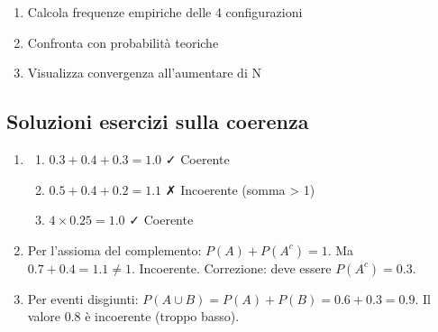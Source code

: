 \documentclass[
  italian,
  letterpaper,
  a4paper,
  11pt,
  open=any]{scrbook}
\providecommand{\tightlist}{%
  \setlength{\itemsep}{0pt}\setlength{\parskip}{0pt}}
\theoremstyle{plain}
\theoremstyle{definition}
\theoremstyle{definition}
\theoremstyle{remark}
\begin{document}
\begin{tcolorbox}
\begin{enumerate}
  \begin{enumerate}
  \def\labelenumii{\alph{enumii}.}
  \tightlist
  \item
    Calcola frequenze empiriche delle 4 configurazioni
  \item
    Confronta con probabilità teoriche
  \item
    Visualizza convergenza all'aumentare di N
  \end{enumerate}
\end{enumerate}

\end{tcolorbox}

\begin{tcolorbox}[enhanced jigsaw, arc=.35mm, bottomrule=.15mm, bottomtitle=1mm, breakable, colback=white, colbacktitle=quarto-callout-tip-color!10!white, colframe=quarto-callout-tip-color-frame, coltitle=black, left=2mm, leftrule=.75mm, opacityback=0, opacitybacktitle=0.6, rightrule=.15mm, title=\textcolor{quarto-callout-tip-color}{\faLightbulb}\hspace{0.5em}{Soluzioni}, titlerule=0mm, toprule=.15mm, toptitle=1mm]

\subsection{Soluzioni esercizi sulla
coerenza}\label{soluzioni-esercizi-sulla-coerenza}

\begin{enumerate}
\def\labelenumi{\arabic{enumi}.}
\item
  \begin{enumerate}
  \def\labelenumii{\alph{enumii}.}
  \tightlist
  \item
    \(0.3 + 0.4 + 0.3 = 1.0\) ✓ Coerente\\
  \item
    \(0.5 + 0.4 + 0.2 = 1.1\) ✗ Incoerente (somma \textgreater{} 1)\\
  \item
    \(4 \times 0.25 = 1.0\) ✓ Coerente
  \end{enumerate}
\item
  Per l'assioma del complemento: \(P(A) + P(A^c) = 1\). Ma
  \(0.7 + 0.4 = 1.1 \neq 1\). Incoerente. Correzione: deve essere
  \(P(A^c) = 0.3\).
\item
  Per eventi disgiunti: \(P(A \cup B) = P(A) + P(B) = 0.6 + 0.3 = 0.9\).
  Il valore 0.8 è incoerente (troppo basso).
\end{enumerate}


\end{tcolorbox}
\end{document}
